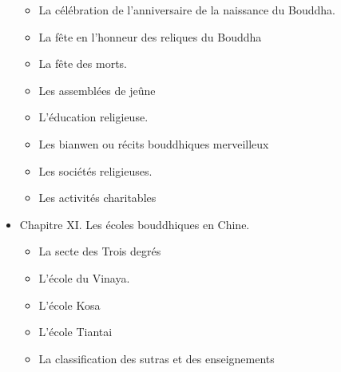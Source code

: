 \begin{itemize}
\begin{itemize}
        \item La célébration de l'anniversaire de la naissance du Bouddha.
    \end{itemize}
    \begin{itemize}
        \item La fête en l'honneur des reliques du Bouddha
    \end{itemize}
    \begin{itemize}
        \item La fête des morts.
    \end{itemize}
    \begin{itemize}
        \item Les assemblées de jeûne
    \end{itemize}
    \begin{itemize}
        \item L'éducation religieuse.
    \end{itemize}
    \begin{itemize}
        \item Les bianwen ou récits bouddhiques merveilleux
    \end{itemize}
    \begin{itemize}
        \item Les sociétés religieuses.
    \end{itemize}
    \begin{itemize}
        \item Les activités charitables
    \end{itemize}
    \item Chapitre XI. Les écoles bouddhiques en Chine.
    \begin{itemize}
        \item La secte des Trois degrés
    \end{itemize}
    \begin{itemize}
        \item L'école du Vinaya.
    \end{itemize}
    \begin{itemize}
        \item L'école Kosa
    \end{itemize}
    \begin{itemize}
        \item L'école Tiantai
    \end{itemize}
    \begin{itemize}
        \item La classification des sutras et des enseignements

\end{itemize}
\end{itemize}
